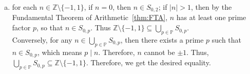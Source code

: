 \documentclass{elegantbook}
\begin{document}
\begin{problemset}[Exercises]
\begin{solution}
\begin{enumerate}[(a)]
\[      \]
      which is a union of sets in $\mathcal{B}$ and hence is open. Therefore, $S_{a, q}$ is closed.
      \item for each $n\in \mathbb{Z}\setminus \{-1, 1\}$, if $n=0$, then $n\in S_{0,2}$; if $|n|>1$, then by the Fundamental Theorem of Arithmetic~\ref{thm:FTA}, $n$ has at least one prime factor $p$, so that $n \in S_{0,p}$. Thus $\mathbb{Z} \setminus \{-1, 1\} \subseteq \bigcup_{p \in \mathbb{P}} S_{0, p}$. \\
      Conversely, for any $n \in \bigcup_{p \in \mathbb{P}} S_{0, p}$, then there exists a prime $p$ such that $n \in S_{0, p}$, which means $p \mid n$. Therefore, $n$ cannot be $\pm 1$. Thus, $\bigcup_{p \in \mathbb{P}} S_{0, p} \subseteq \mathbb{Z} \setminus \{-1, 1\}$. Therefore, we get the desired equality.
    \end{enumerate}
  \end{solution}
\end{problemset}
\end{document}
